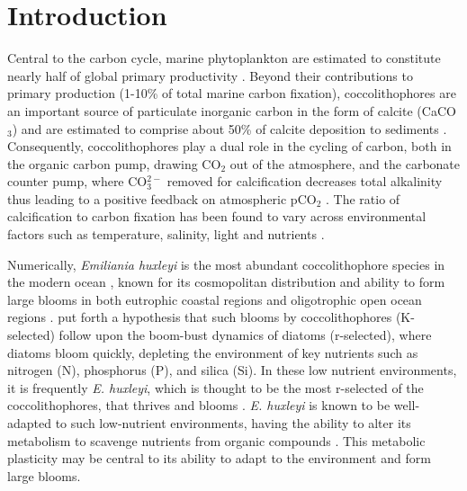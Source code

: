  


\section{Introduction}
Central to the carbon cycle, marine phytoplankton are estimated to constitute nearly half of global primary productivity \citep{Field1998}. Beyond their contributions to primary production (1-10\% of total marine carbon fixation), coccolithophores are an important source of particulate inorganic carbon in the form of calcite (CaCO$_{3}$) and are estimated to comprise about 50\% of calcite deposition to sediments \citep{Poulton2007}. Consequently, coccolithophores play a dual role in the cycling of carbon, both in the organic carbon pump, drawing CO$_2$ out of the atmosphere, and the carbonate counter pump, where CO$_{3}^{2-}$ removed for calcification decreases total alkalinity thus leading to a positive feedback on atmospheric pCO$_2$ \citep{Zondervan2002}. The ratio of calcification to carbon fixation has been found to vary across environmental factors such as temperature, salinity, light and nutrients \citep{Paasche2001, Bollmann2007, Zondervan2007, Feng2008}. \par

Numerically, \textit{Emiliania huxleyi} is the most abundant coccolithophore species in the modern ocean \citep{Paasche2001}, known for its cosmopolitan distribution and ability to form large blooms in both eutrophic coastal regions and oligotrophic open ocean regions \citep{Holligan1993, Brown1994}. \citet{Margalef1978} put forth a hypothesis that such blooms by coccolithophores (K-selected) follow upon the boom-bust dynamics of diatoms (r-selected), where diatoms bloom quickly, depleting the environment of key nutrients such as nitrogen (N), phosphorus (P), and silica (Si). In these low nutrient environments, it is frequently \textit{E. huxleyi}, which is thought to be the most r-selected of the coccolithophores, that thrives and blooms \citep{Litchman2006}. \textit{E. huxleyi} is known to be well-adapted to such low-nutrient environments, having the ability to alter its metabolism to scavenge nutrients from organic compounds \citep{Palenik1997, Dyhrman2003, Bruhn2010, Rouco2013}. This metabolic plasticity may be central to its ability to adapt to the environment and form large blooms.\par


